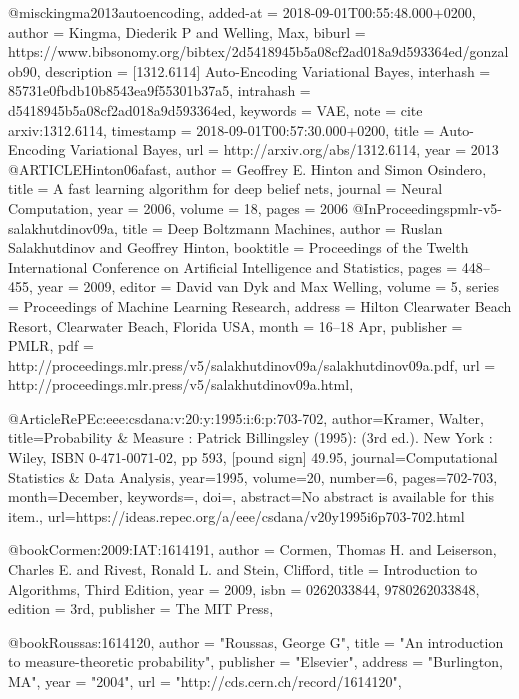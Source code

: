 @misc{kingma2013autoencoding,
  added-at = {2018-09-01T00:55:48.000+0200},
  author = {Kingma, Diederik P and Welling, Max},
  biburl = {https://www.bibsonomy.org/bibtex/2d5418945b5a08cf2ad018a9d593364ed/gonzalob90},
  description = {[1312.6114] Auto-Encoding Variational Bayes},
  interhash = {85731e0fbdb10b8543ea9f55301b37a5},
  intrahash = {d5418945b5a08cf2ad018a9d593364ed},
  keywords = {VAE},
  note = {cite arxiv:1312.6114},
  timestamp = {2018-09-01T00:57:30.000+0200},
  title = {Auto-Encoding Variational Bayes},
  url = {http://arxiv.org/abs/1312.6114},
  year = 2013
}
@ARTICLE{Hinton06afast,
    author = {Geoffrey E. Hinton and Simon Osindero},
    title = {A fast learning algorithm for deep belief nets},
    journal = {Neural Computation},
    year = {2006},
    volume = {18},
    pages = {2006}
}
@InProceedings{pmlr-v5-salakhutdinov09a,
  title = 	 {Deep Boltzmann Machines},
  author = 	 {Ruslan Salakhutdinov and Geoffrey Hinton},
  booktitle = 	 {Proceedings of the Twelth International Conference on Artificial Intelligence and Statistics},
  pages = 	 {448--455},
  year = 	 {2009},
  editor = 	 {David van Dyk and Max Welling},
  volume = 	 {5},
  series = 	 {Proceedings of Machine Learning Research},
  address = 	 {Hilton Clearwater Beach Resort, Clearwater Beach, Florida USA},
  month = 	 {16--18 Apr},
  publisher = 	 {PMLR},
  pdf = 	 {http://proceedings.mlr.press/v5/salakhutdinov09a/salakhutdinov09a.pdf},
  url = 	 {http://proceedings.mlr.press/v5/salakhutdinov09a.html},
}


@Article{RePEc:eee:csdana:v:20:y:1995:i:6:p:703-702,
  author={Kramer, Walter},
  title={{Probability \& Measure : Patrick Billingsley (1995): (3rd ed.). New York : Wiley, ISBN 0-471-0071-02, pp 593, [pound sign] 49.95}},
  journal={Computational Statistics \& Data Analysis},
  year=1995,
  volume={20},
  number={6},
  pages={702-703},
  month={December},
  keywords={},
  doi={},
  abstract={No abstract is available for this item.},
  url={https://ideas.repec.org/a/eee/csdana/v20y1995i6p703-702.html}
}

@book{Cormen:2009:IAT:1614191,
 author = {Cormen, Thomas H. and Leiserson, Charles E. and Rivest, Ronald L. and Stein, Clifford},
 title = {Introduction to Algorithms, Third Edition},
 year = {2009},
 isbn = {0262033844, 9780262033848},
 edition = {3rd},
 publisher = {The MIT Press},
} 

@book{Roussas:1614120,
      author        = "Roussas, George G",
      title         = "{An introduction to measure-theoretic probability}",
      publisher     = "Elsevier",
      address       = "Burlington, MA",
      year          = "2004",
      url           = "http://cds.cern.ch/record/1614120",
}

